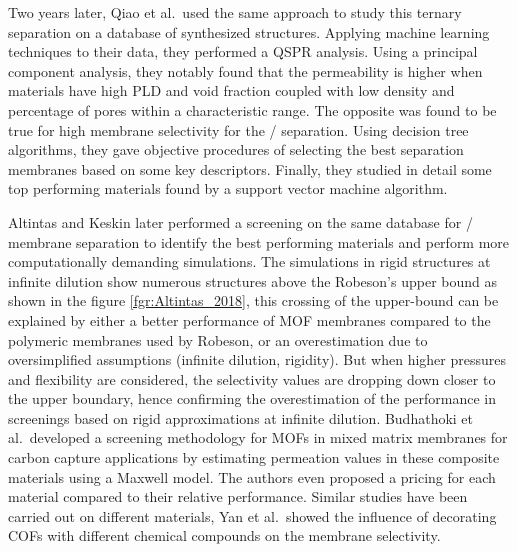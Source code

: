 \documentclass[main.tex]{subfiles}
\begin{document}
Two years later, Qiao et al.\ used the same approach to study this ternary separation on a database of synthesized structures.\cite{Qiao_2018} Applying machine learning techniques to their data, they performed a QSPR analysis. Using a principal component analysis, they notably found that the permeability is higher when materials have high PLD and void fraction coupled with low density and percentage of pores within a characteristic range. The opposite was found to be true for high membrane selectivity for the / separation. Using decision tree algorithms, they gave objective procedures of selecting the best separation membranes based on some key descriptors. Finally, they studied in detail some top performing materials found by a support vector machine algorithm.

Altintas and Keskin later performed a screening on the same database for / membrane separation to identify the best performing materials and perform more computationally demanding simulations.\cite{Altintas_2018} {The simulations in rigid structures at infinite dilution show numerous structures above the Robeson's upper bound as shown in the figure \ref{fgr:Altintas_2018}, this crossing of the upper-bound can be explained by either a better performance of MOF membranes compared to the polymeric membranes used by Robeson, or an overestimation due to oversimplified assumptions (infinite dilution, rigidity). But when higher pressures and flexibility are considered, the selectivity values are dropping down closer to the upper boundary}, hence confirming the overestimation of the performance in screenings {based on rigid approximations at infinite dilution}.  Budhathoki et al.\ developed a screening methodology for MOFs in mixed matrix membranes for carbon capture applications by estimating permeation values in these composite materials using a Maxwell model.\cite{Budhathoki_2019} The authors even proposed a pricing for each material compared to their relative performance. Similar studies have been carried out on different materials, Yan et al.\ showed the influence of decorating COFs with different chemical compounds on the membrane selectivity.\cite{Yan_2018}
\end{document}
